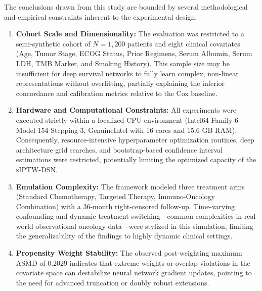 \documentclass[10pt,twocolumn]{article}
\newenvironment{limitations}{\par\medskip}{\par\medskip}
\begin{document}
\begin{limitations}
The conclusions drawn from this study are bounded by several methodological and empirical constraints inherent to the experimental design:
\begin{enumerate}
    \item \textbf{Cohort Scale and Dimensionality:} The evaluation was restricted to a semi-synthetic cohort of $N = 1,200$ patients and eight clinical covariates (Age, Tumor Stage, ECOG Status, Prior Regimens, Serum Albumin, Serum LDH, TMB Marker, and Smoking History). This sample size may be insufficient for deep survival networks to fully learn complex, non-linear representations without overfitting, partially explaining the inferior concordance and calibration metrics relative to the Cox baseline.
    \item \textbf{Hardware and Computational Constraints:} All experiments were executed strictly within a localized CPU environment (Intel64 Family 6 Model 154 Stepping 3, GenuineIntel with 16 cores and 15.6 GB RAM). Consequently, resource-intensive hyperparameter optimization routines, deep architecture grid searches, and bootstrap-based confidence interval estimations were restricted, potentially limiting the optimized capacity of the \textsc{sIPTW-DSN}.
    \item \textbf{Emulation Complexity:} The framework modeled three treatment arms (Standard Chemotherapy, Targeted Therapy, Immuno-Oncology Combination) with a 36-month right-censored follow-up. Time-varying confounding and dynamic treatment switching—common complexities in real-world observational oncology data—were stylized in this simulation, limiting the generalizability of the findings to highly dynamic clinical settings.
    \item \textbf{Propensity Weight Stability:} The observed post-weighting maximum ASMD of 0.2029 indicates that extreme weights or overlap violations in the covariate space can destabilize neural network gradient updates, pointing to the need for advanced truncation or doubly robust extensions.
\end{enumerate}
\end{limitations}
\end{document}
